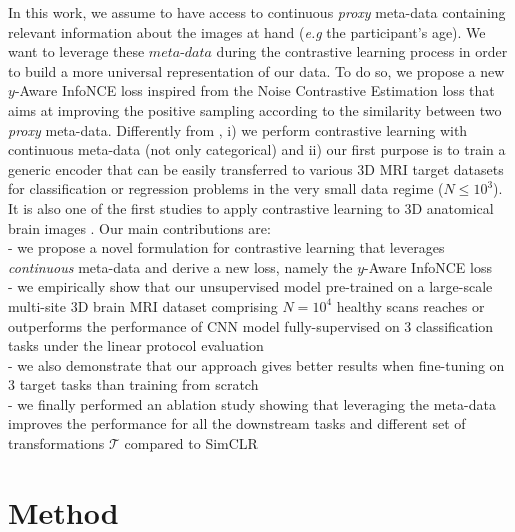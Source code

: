 \documentclass[runningheads]{llncs}
\begin{document}
In this work, we assume to have access to continuous \textit{proxy} meta-data containing relevant information about the images at hand (\textit{e.g} the participant's age). %
We want to leverage these $\textit{meta-data}$ during the contrastive learning process in order to build a more universal representation of our data. To do so, we propose a new $y$-Aware InfoNCE loss inspired from the Noise Contrastive Estimation loss \cite{gutmann2010infoNCE} that aims at improving the positive sampling according to the similarity between two \textit{proxy} meta-data. Differently from \cite{khosla2020}, i) we perform contrastive learning with continuous meta-data (not only categorical) and ii) our first purpose is to train a generic encoder that can be easily transferred to various 3D MRI target datasets for classification or regression problems in the very small data regime ($N \le 10^3$). It is also one of the first studies to apply contrastive learning to 3D anatomical brain images \cite{chaitanya2020contrastive}.
Our main contributions are:\\
- we propose a novel formulation for contrastive learning that leverages \textit{continuous} meta-data and derive a new loss, namely the $y$-Aware InfoNCE loss\\
- we empirically show that our unsupervised model pre-trained on a large-scale multi-site 3D brain MRI dataset comprising $N=10^4$ healthy scans reaches or outperforms the performance of CNN model fully-supervised on 3 classification tasks under the linear protocol evaluation\\
- we also demonstrate that our approach gives better results when fine-tuning on 3 target tasks than training from scratch\\
- we finally performed an ablation study showing that leveraging the meta-data improves the performance for all the downstream tasks and different set of transformations $\mathcal{T}$ compared to SimCLR \cite{chen2020simCLR}

\section{Method}
\end{document}
